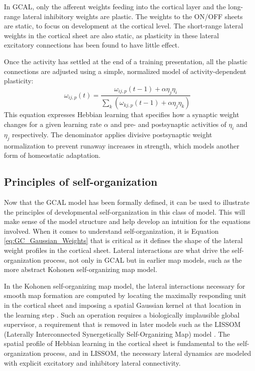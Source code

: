 \documentclass[phd,ianc,twoside]{infthesis}
\begin{document}
In GCAL, only the afferent weights feeding into the cortical layer and
the long-range lateral inhibitory weights are plastic. The
weights to the ON/OFF sheets are static, to focus on development at
the cortical level.  The short-range lateral weights in the cortical
sheet are also static, as plasticity in these lateral excitatory
connections has been found to have little effect.

Once the activity has
settled at the end of a training presentation, all the plastic
connections are adjusted using a simple, normalized model of
activity-dependent plasticity:
\begin{equation}
  \label{eq:hebbian_learning}
  \omega_{ij,p}(t) = \frac{\omega_{ij,p}(t-1) + \alpha \eta_j\eta_i}
        {\sum_k (\omega_{kj,p} (t - 1) + \alpha \eta_j \eta_k )}
\end{equation}
This equation expresses Hebbian learning that specifies how a synaptic
weight changes for a given learning rate $\alpha$ and pre- and
postsynaptic activities of $\eta_i$ and $\eta_j$ respectively. The
denominator applies divisive postsynaptic weight normalization to
prevent runaway increases in strength, which models another form of
homeostatic adaptation.

\subsection{Principles of self-organization}
\label{section:self_organization_principles}

Now that the GCAL model has been formally defined, it can be used to
illustrate the principles of developmental self-organization in this
class of model. This will make sense of the model structure and help
develop an intuition for the equations involved. When it comes to
understand self-organization, it is Equation
\ref{eq:GC_Gaussian_Weights} that is critical as it defines the shape of
the lateral weight profiles in the cortical sheet. Lateral interactions
are what drive the self-organization process, not only in GCAL but in
earlier map models, such as the more abstract Kohonen self-organizing
map model.

In the Kohonen self-organizing map model, the lateral interactions
necessary for smooth map formation are computed by locating the
maximally responding unit in the cortical sheet and imposing a spatial
Gaussian kernel at that location in the learning step
\citep{kohonen_biocyber82}. Such an operation requires a biologically
implausible global supervisor, a requirement that is removed in later
models such as the LISSOM (Laterally Interconnected Synergetically
Self-Organizing Map) model
\citep{sirosh_biocyber94,miikkulainen_2005}. The spatial profile of
Hebbian learning in the cortical sheet is fundamental to the
self-organization process, and in LISSOM, the necessary lateral dynamics
are modeled with explicit excitatory and inhibitory lateral
connectivity.
\end{document}
